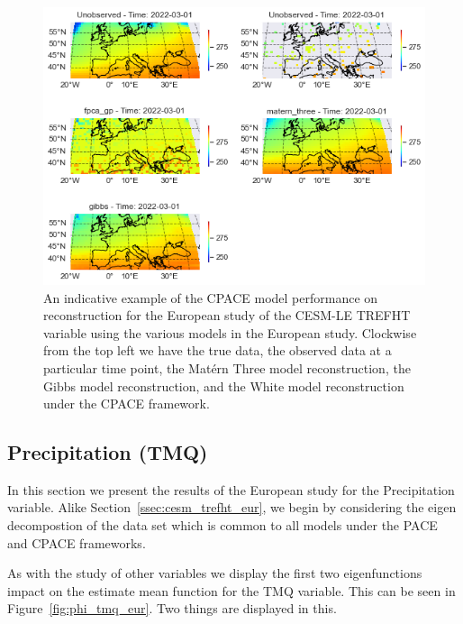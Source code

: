 \begin{figure}
	\centering
	\includegraphics[width=\textwidth]{full_ex_trefht_eur}
	\caption{An indicative example of the CPACE model performance on reconstruction for the European study of the CESM-LE TREFHT variable using the various models in the European study. Clockwise from the top left we have the true data, the observed data at a particular time point, the Mat\'ern Three model reconstruction, the Gibbs model reconstruction, and the White model reconstruction under the CPACE framework.}
	\label{fig:full_ex_trefht_eur}
\end{figure}

\subsection{Precipitation (TMQ)\label{ssec:cesm_tmq_eur}}
In this section we present the results of the European study for the Precipitation variable. 
Alike Section~\ref{ssec:cesm_trefht_eur}, we begin by considering the eigen decompostion of the data set which is common to all models under the PACE and CPACE frameworks.

As with the study of other variables we display the first two eigenfunctions impact on the estimate mean function for the TMQ variable.
This can be seen in Figure~\ref{fig:phi_tmq_eur}.
Two things are displayed in this.

